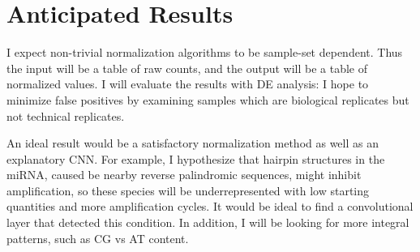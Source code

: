 \documentclass[dvips,12pt]{article}
\begin{document}
\section{Anticipated Results}

I expect non-trivial normalization algorithms to be sample-set dependent. Thus the input will be a table of raw counts, and the
output will be a table of normalized values. I will evaluate the results with DE analysis: I hope to minimize false positives by examining samples which are biological replicates but not technical replicates. 

An ideal result would be a satisfactory normalization method as well as an explanatory CNN. For example, I hypothesize that hairpin structures in the miRNA, caused be nearby reverse palindromic sequences, might inhibit amplification, so these species will be underrepresented with low starting quantities and more amplification cycles. It would be ideal to find a convolutional layer that detected this condition. In addition, I will be looking for more integral patterns, such as CG vs AT content.


%
%

%
\end{document}
